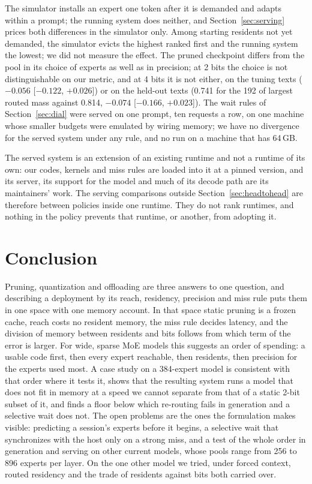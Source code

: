 \documentclass[11pt]{article}
\newcommand{\ci}[2]{[$#1$, $#2$]}
\begin{document}
The simulator installs an expert one token after it is demanded and adapts within a prompt;
the running system does neither, and Section~\ref{sec:serving} prices both differences in the simulator only. Among starting residents not yet demanded, the simulator evicts
the highest ranked first and the running system the lowest; we did not measure the effect. The pruned checkpoint differs from the pool in its choice of experts as well as in precision; at 2 bits the choice is not distinguishable on our metric, and at 4 bits it is not either, on the tuning texts ($-0.056$ \ci{-0.122}{+0.026}) or on the held-out texts (0.741 for the 192 of largest routed mass against 0.814, $-0.074$ \ci{-0.166}{+0.023}). The wait rules of Section~\ref{sec:dial} were served on one prompt, ten requests a row, on one machine whose smaller budgets were emulated by wiring memory; we have no divergence for the served system under any rule, and no run on a machine that has 64\,GB.

The served system is an extension of an existing runtime and not a runtime of its own: our codes, kernels and miss rules are loaded into it at a pinned version, and its server, its support for the model and much of its decode path are its maintainers' work. The serving comparisons outside Section~\ref{sec:headtohead} are therefore between policies inside one runtime. They do not rank runtimes, and nothing in the policy prevents that runtime, or another, from adopting it.

\section{Conclusion}

Pruning, quantization and offloading are three answers to one question, and describing a
deployment by its reach, residency, precision and miss rule puts them in one space with one
memory account. In that space static pruning is a frozen cache, reach costs no resident memory, the miss rule decides latency, and the division of
memory between residents and bits follows from which term of the error is larger. For wide,
sparse MoE models this suggests an order of spending: a usable code first, then every expert
reachable, then residents, then precision for the experts used most. A case study on a
384-expert model is consistent with that order where it tests it, shows that the resulting system runs a model that does
not fit in memory at a speed we cannot separate from that of a static 2-bit subset of it, and finds a floor below which
re-routing fails in generation and a selective wait does not. The open problems are the ones the formulation makes visible:
predicting a session's experts before it begins, a selective wait that synchronizes with the host only on a strong miss, and a test of the whole order in generation and serving on
other current models, whose pools range from 256 to 896 experts per layer. On the one other model we tried, under forced context, routed residency and the trade of residents against bits both carried over.
\end{document}
